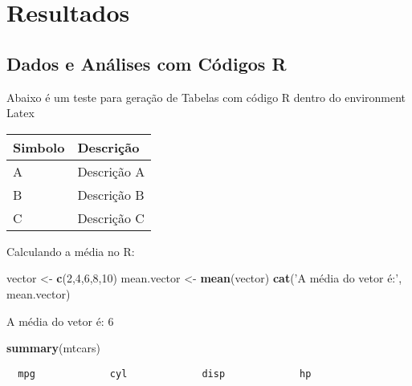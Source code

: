 \documentclass[12pt,openright,oneside,a4paper,chapter=TITLE,section=TITLE,subsection=Title,english,french,spanish,portugues,sumario=tradicional]{04-class-files/abntex2}
\newenvironment{Shaded}{\begin{snugshade}}{\end{snugshade}}
\newcommand{\DecValTok}[1]{\textcolor[rgb]{0.00,0.00,0.81}{#1}}
\newcommand{\KeywordTok}[1]{\textcolor[rgb]{0.13,0.29,0.53}{\textbf{#1}}}
\newcommand{\NormalTok}[1]{#1}
\newcommand{\StringTok}[1]{\textcolor[rgb]{0.31,0.60,0.02}{#1}}
\begin{document}
\part{Resultados}

\chapter{Dados e Análises com Códigos R}

Abaixo é um teste para geração de Tabelas com código R dentro do environment Latex

\begin{tabular}{l|l}
\hline
Simbolo & Descrição\\
\hline
A & Descrição A\\
\hline
B & Descrição B\\
\hline
C & Descrição C\\
\hline
\end{tabular}

Calculando a média no R:

\begin{Shaded}
\begin{Highlighting}[]
\NormalTok{vector <-}\StringTok{ }\KeywordTok{c}\NormalTok{(}\DecValTok{2}\NormalTok{,}\DecValTok{4}\NormalTok{,}\DecValTok{6}\NormalTok{,}\DecValTok{8}\NormalTok{,}\DecValTok{10}\NormalTok{)}
\NormalTok{mean.vector <-}\StringTok{ }\KeywordTok{mean}\NormalTok{(vector)}
\KeywordTok{cat}\NormalTok{(}\StringTok{'A média do vetor é:'}\NormalTok{, mean.vector)}
\end{Highlighting}
\end{Shaded}

A média do vetor é: 6

\begin{Shaded}
\begin{Highlighting}[]
\KeywordTok{summary}\NormalTok{(mtcars)}
\end{Highlighting}
\end{Shaded}

\begin{verbatim}
  mpg             cyl             disp             hp       
\end{verbatim}
\end{document}
